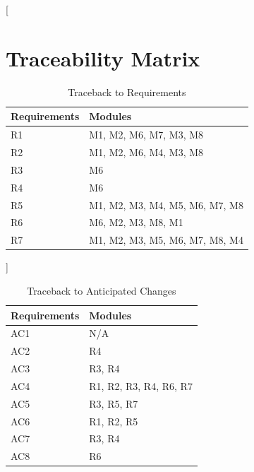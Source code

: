 \documentclass[titlepage]{article}
\newcommand{\group}[1]{{\leavevmode\color{red}[#1]}}
\begin{document}
    \group{
\section{Traceability Matrix}
\begin{table}[h!]
\centering
    \begin{tabular}{| p{5cm} | p{5cm} |}    \hline
    Requirements &Modules\\ \hline

      R1  &M1, M2, M6, M7, M3, M8\\ \hline
      R2  &M1, M2, M6, M4, M3, M8 \\ \hline
      R3  &M6 \\ \hline
      R4  &M6 \\ \hline
      R5  &M1, M2, M3, M4, M5, M6, M7, M8 \\ \hline
      R6  &M6, M2, M3, M8, M1 \\ \hline
      R7  &M1, M2, M3, M5, M6, M7, M8, M4 \\ \hline
      
    \end{tabular}
    \caption{Traceback to Requirements}
\label{table:Traceback to Requirements}
\end{table}
}
\begin{table}[h!]
\centering
    \begin{tabular}{| p{5cm} | p{5cm} |}    \hline
    Requirements &Modules\\ \hline
    
      AC1  & N/A\\ \hline
      AC2  & R4\\ \hline
      AC3  & R3, R4\\ \hline
      AC4  & R1, R2, R3, R4, R6, R7\\ \hline
      AC5  & R3, R5, R7\\ \hline
      AC6  & R1, R2, R5\\ \hline
      AC7  & R3, R4\\ \hline
      AC8  & R6\\ \hline
      
    \end{tabular}
    \caption{Traceback to Anticipated Changes}
\label{table:Traceback to Anticipated Changes}
\end{table}
\end{document}
